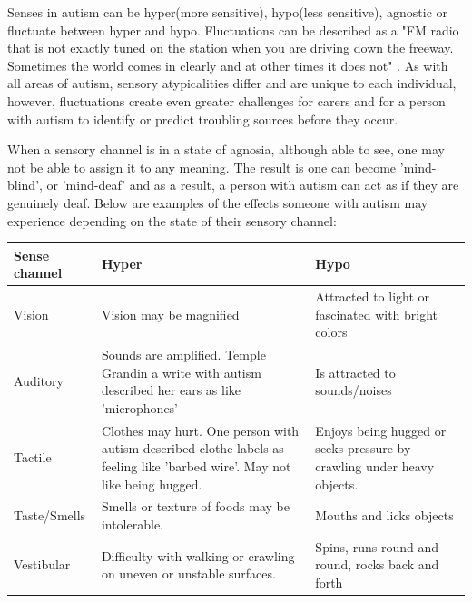 \documentclass[11pt]{report}
\begin{document}
Senses in autism can be hyper(more sensitive), hypo(less sensitive), agnostic or fluctuate between hyper and hypo\cite{bayes}. Fluctuations can be described as a "FM radio that is not exactly tuned on the station when you are driving down the freeway. Sometimes the world comes in clearly and at other times it does not" \cite{olgab}. As with all areas of autism, sensory atypicalities differ and are unique to each individual, however, fluctuations create even greater challenges for carers and for a person with autism to identify or predict troubling sources before they occur. 

When a sensory channel is in a state of agnosia, although able to see, one may not be able to assign it to any meaning. The result is one can become 'mind-blind', or 'mind-deaf' and as a result, a person with autism can act as if they are genuinely deaf. Below are examples of the effects someone with autism may experience depending on the state of their sensory channel:

\begin{table}[H]
    \begin{tabular}{| l | p{5cm} | p{5cm} |}
    \hline
    Sense channel & Hyper                                                                                                                      & Hypo                                                                   \\
    \hline
    \hline
    Vision        & Vision may be magnified                                                                                                    & Attracted to light or fascinated with bright colors                    \\
    \hline
    Auditory      & Sounds are amplified. Temple Grandin a write with autism described her ears as like 'microphones'                          & Is attracted to sounds/noises                                          \\
    \hline
    Tactile       & Clothes may hurt. One person with autism described clothe labels as feeling like 'barbed wire'. May not like being hugged. & Enjoys being hugged or seeks pressure by crawling under heavy objects. \\
    \hline
    Taste/Smells & Smells or texture of foods may be intolerable. & Mouths and licks objects \\
    \hline
    Vestibular & Difficulty with walking or crawling on uneven or unstable surfaces. & Spins, runs round and round, rocks back and forth \\
    \hline
    \end{tabular}
\end{table}
\end{document}
